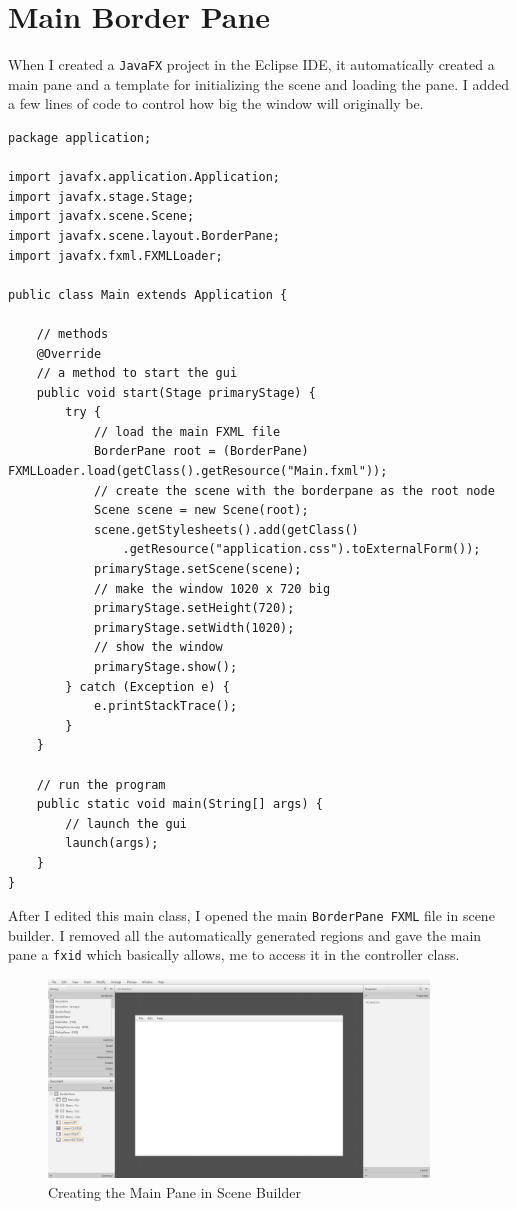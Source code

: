 \documentclass[../../../../main.tex]{subfiles}
\begin{document}
\section{Main Border Pane}
When I created a \texttt{JavaFX} project in the Eclipse IDE, it automatically created a main pane and a template for initializing the scene and loading the pane. I added a few lines of code to control how big the window will originally be.
\begin{verbatim}
package application;

import javafx.application.Application;
import javafx.stage.Stage;
import javafx.scene.Scene;
import javafx.scene.layout.BorderPane;
import javafx.fxml.FXMLLoader;

public class Main extends Application {
	
	// methods
	@Override
	// a method to start the gui
	public void start(Stage primaryStage) {
		try {
			// load the main FXML file
			BorderPane root = (BorderPane) FXMLLoader.load(getClass().getResource("Main.fxml"));
			// create the scene with the borderpane as the root node
			Scene scene = new Scene(root);
			scene.getStylesheets().add(getClass()
				.getResource("application.css").toExternalForm());
			primaryStage.setScene(scene);
			// make the window 1020 x 720 big
			primaryStage.setHeight(720);
			primaryStage.setWidth(1020);
			// show the window
			primaryStage.show();
		} catch (Exception e) {
			e.printStackTrace();
		}
	}
	
	// run the program
	public static void main(String[] args) {
		// launch the gui
		launch(args);
	}
}
\end{verbatim}
After I edited this main class, I opened the main \texttt{BorderPane FXML} file in scene builder. I removed all the automatically generated regions and gave the main pane a \texttt{fxid} which basically allows, me to access it in the controller class.

\begin{figure}[H]
	\begin{center}
		\includegraphics[width=0.9\textwidth]{images/mainFXML}
	\end{center}
	\caption{Creating the Main Pane in Scene Builder}
\end{figure}
\end{document}
